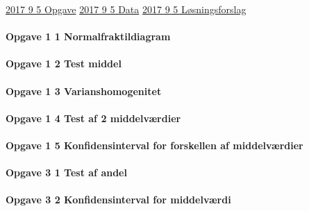 \documentclass[]{book}
\let\oldparagraph\paragraph
\renewcommand{\paragraph}[1]{\oldparagraph{#1}\mbox{}}
\begin{document}
\href{https://www.dropbox.com/s/3gd6mcocowe8glq/2017\%209\%20Statistik\%20Fin.pdf?dl=1}{2017 9 5 Opgave}
\href{https://www.dropbox.com/s/y4p8j90wjbzhtb3/2017\%209\%20statistik\%20Data\%202.RE.xlsx?dl=1}{2017 9 5 Data}
\href{https://www.dropbox.com/s/wruqocv7g0fvkob/2017\%209\%20Statistik\%20Fin\%20opg\%201\%20og\%203\%20l\%C3\%B8sning\%20skabelon\%20Freestat\%20.docx?dl=1}{2017 9 5 Løsningsforslag}

\hypertarget{opgave-1-1-normalfraktildiagram}{%
\paragraph{Opgave 1 1 Normalfraktildiagram}\label{opgave-1-1-normalfraktildiagram}}

\hypertarget{opgave-1-2-test-middel}{%
\paragraph{Opgave 1 2 Test middel}\label{opgave-1-2-test-middel}}

\hypertarget{opgave-1-3-varianshomogenitet}{%
\paragraph{Opgave 1 3 Varianshomogenitet}\label{opgave-1-3-varianshomogenitet}}

\hypertarget{opgave-1-4-test-af-2-middelvrdier}{%
\paragraph{Opgave 1 4 Test af 2 middelværdier}\label{opgave-1-4-test-af-2-middelvrdier}}

\hypertarget{opgave-1-5-konfidensinterval-for-forskellen-af-middelvrdier}{%
\paragraph{Opgave 1 5 Konfidensinterval for forskellen af middelværdier}\label{opgave-1-5-konfidensinterval-for-forskellen-af-middelvrdier}}

\hypertarget{opgave-3-1-test-af-andel}{%
\paragraph{Opgave 3 1 Test af andel}\label{opgave-3-1-test-af-andel}}

\hypertarget{opgave-3-2-konfidensinterval-for-middelvrdi}{%
\paragraph{Opgave 3 2 Konfidensinterval for middelværdi}\label{opgave-3-2-konfidensinterval-for-middelvrdi}}
\end{document}
